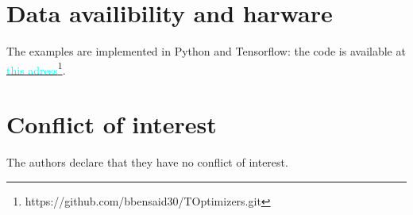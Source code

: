 \section*{Data availibility and harware}
The examples are implemented in Python and Tensorflow: the code is available at \href {https://github.com/bbensaid30/TOptimizers.git}{\textcolor{cyan}{this adress}}\footnote{https://github.com/bbensaid30/TOptimizers.git}. 

\section*{Conflict of interest}
The authors declare that they have no conflict of interest.

\newpage

\appendix

%
%
%
%

